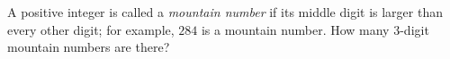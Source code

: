 A positive integer is called a \emph{mountain number} if its middle digit is larger than every other digit; for example, $284$ is a mountain number. How many $3$-digit mountain numbers are there?
